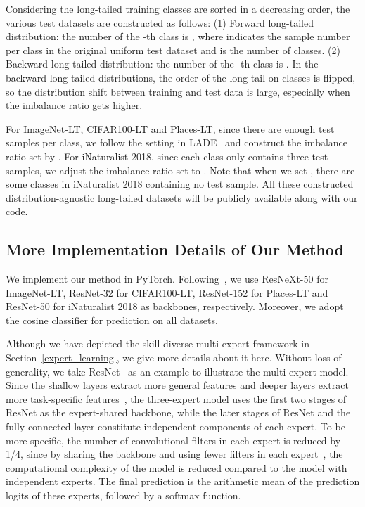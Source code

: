 \documentclass{article}
\begin{document}
Considering the long-tailed training classes are sorted in a decreasing order, the various test datasets are constructed as follows: (1) Forward long-tailed distribution: the number of the -th class is , where  indicates the sample number  per class in the original  uniform test dataset and  is the number of classes.  (2) Backward long-tailed distribution: the number of the -th class is .  In the backward long-tailed distributions,  the  order of  the long tail on classes is flipped, so the distribution shift between training and test data is large, especially when    the imbalance ratio gets higher. 


For ImageNet-LT, CIFAR100-LT and Places-LT, since there are enough test samples per class,  we follow the setting in LADE~\cite{hong2020disentangling} and construct the imbalance ratio set by .  For    iNaturalist 2018,  since each class only contains three test samples,   we adjust   the imbalance ratio set to . Note that when we set , there are some classes  in iNaturalist 2018 containing no test sample. All   these constructed distribution-agnostic long-tailed datasets will be publicly available along with our code.




 

\subsection{More Implementation  Details of Our Method} \label{App_C3}
We implement our   method  in PyTorch. Following~\cite{hong2020disentangling,wang2020long}, we use ResNeXt-50 for ImageNet-LT, ResNet-32 for CIFAR100-LT, ResNet-152 for Places-LT and ResNet-50 for iNaturalist 2018 as  backbones, respectively. Moreover,   we adopt the cosine classifier for prediction on all datasets. 

Although we have depicted the skill-diverse multi-expert framework in Section~\ref{expert_learning},   we give more details about it here.
Without loss of generality, we take ResNet~\cite{he2016deep} as an example to illustrate the  multi-expert model.   Since the shallow layers  extract more general features and deeper layers extract more task-specific features~\cite{yosinski2014transferable}, the three-expert model  uses the first two stages of ResNet as the expert-shared backbone, while the later stages of ResNet and the fully-connected layer constitute independent components  of each expert. 
To be more specific, the number of convolutional  filters in each expert is reduced by 1/4, since by sharing the backbone and using fewer filters in each expert~\cite{wang2020long, zhou2020bbn}, the computational complexity of the model is reduced compared to the model with     independent experts.  The final prediction is the arithmetic mean  of the prediction logits of these experts, followed by a softmax function. 
\end{document}
